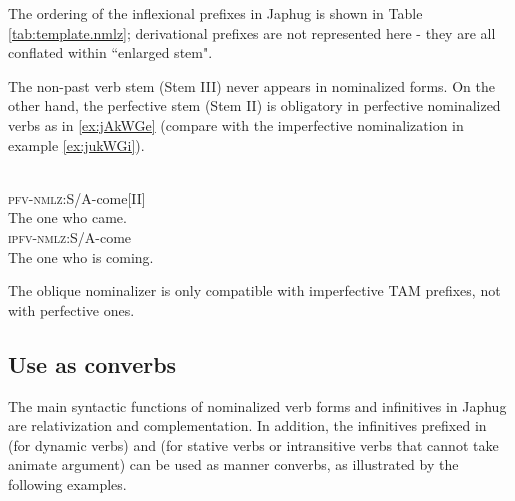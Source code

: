 The ordering of the inflexional prefixes in  Japhug is shown in Table \ref{tab:template.nmlz}; derivational prefixes are not represented here - they are all conflated within   ``enlarged stem".



\begin{table}[H]
\caption{The template of nominalized verbal forms in Japhug} \centering \label{tab:template.nmlz}
\end{table}

The non-past verb stem (Stem III) never appears in nominalized forms. On the other hand, the perfective stem (Stem II) is obligatory in perfective nominalized verbs as in \ref{ex:jAkWGe} (compare with the imperfective nominalization in example \ref{ex:jukWGi}).

 \begin{exe}
\ex \label{ex:jAkWGe}
\gll
  		   \\
  \textsc{pfv-nmlz:}S/A-come[II]   \\
\glt The one who came.
\ex \label{ex:jukWGi}
\gll
  		   \\
  \textsc{ipfv-nmlz:}S/A-come   \\
\glt The one who is coming.
 \end{exe}
 
The oblique nominalizer is only compatible with imperfective TAM prefixes, not with perfective ones. 
 
 \subsection{Use as converbs} \label{sec:converb.kA}
 
 The main syntactic functions of nominalized verb forms and infinitives in Japhug are relativization and complementation.   In addition, the infinitives prefixed  in  (for dynamic verbs) and  (for stative verbs or intransitive verbs that cannot take animate argument) can be used as manner converbs, as illustrated by the following examples.
 
 

